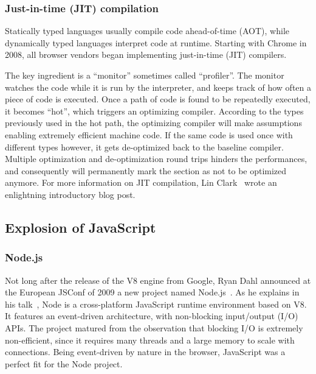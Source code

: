 \subsubsection{Just-in-time (JIT) compilation}%
\label{ssub:just_in_time_jit_compilation}

Statically typed languages usually compile code ahead-of-time (AOT),
while dynamically typed languages interpret code at runtime.
Starting with Chrome in 2008, all browser vendors began implementing
just-in-time (JIT) compilers.

The key ingredient is a ``monitor'' sometimes called ``profiler''.
The monitor watches the code while it is run by the interpreter,
and keeps track of how often a piece of code is executed.
Once a path of code is found to be repeatedly executed, it becomes ``hot'',
which triggers an optimizing compiler.
According to the types previously used in the hot path,
the optimizing compiler will make assumptions enabling
extremely efficient machine code.
If the same code is used once with different types however,
it gets de-optimized back to the baseline compiler.
Multiple optimization and de-optimization round trips
hinders the performances, and consequently will permanently mark
the section as not to be optimized anymore.
For more information on JIT compilation, Lin Clark~\cite{clark-jit}
wrote an enlightning introductory blog post.


\subsection{Explosion of JavaScript}%
\label{sub:explosion_of_javascript}


\subsubsection{Node.js}%
\label{ssub:node_js}

Not long after the release of the V8 engine from Google,
Ryan Dahl announced at the European JSConf of 2009
a new project named Node.js~\cite{node-js-speaker}.
As he explains in his talk~\cite{node-js-video},
Node is a cross-platform JavaScript runtime environment based on V8.
It features an event-driven architecture, with non-blocking input/output (I/O) APIs.
The project matured from the observation that blocking I/O is extremely non-efficient,
since it requires many threads and a large memory to scale with connections.
Being event-driven by nature in the browser,
JavaScript was a perfect fit for the Node project.

